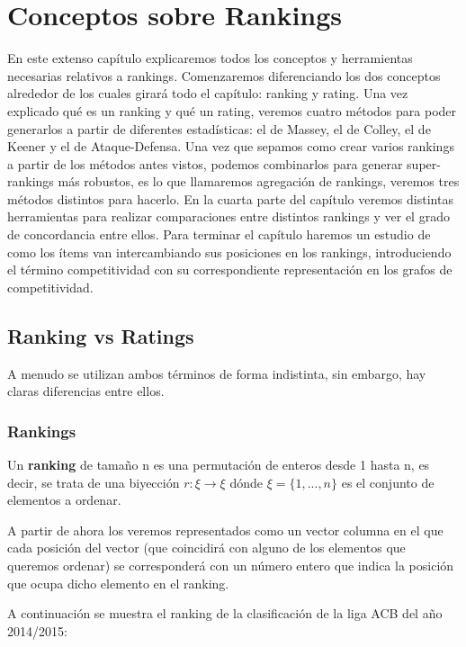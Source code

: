 \chapter{Conceptos sobre Rankings}
En este extenso capítulo explicaremos todos los conceptos y herramientas necesarias relativos a rankings. Comenzaremos diferenciando los dos conceptos alrededor de los cuales girará todo el capítulo: ranking y rating. Una vez explicado qué es un ranking y qué un rating, veremos cuatro métodos para poder generarlos a partir de diferentes estadísticas: el de Massey, el de Colley, el de Keener y el de Ataque-Defensa. Una vez que sepamos como crear varios rankings a partir de los métodos antes vistos, podemos combinarlos para generar super-rankings más robustos, es lo que llamaremos agregación de rankings, veremos tres métodos distintos para hacerlo. En la cuarta parte del capítulo veremos distintas herramientas para realizar comparaciones entre distintos rankings y ver el grado de concordancia entre ellos. Para terminar el capítulo haremos un estudio de como los ítems van intercambiando sus posiciones en los rankings, introduciendo el término competitividad con su correspondiente representación en los grafos de competitividad. 

\section{Ranking vs Ratings}
A menudo se utilizan ambos términos de forma indistinta, sin embargo, hay claras diferencias entre ellos. \cite{cap1}

\subsection{Rankings}
\begin{defi} 
	Un \textbf{ranking} de tamaño n es una permutación de enteros desde 1 hasta n, es decir, se trata de una biyección $r: \xi \rightarrow \xi$ dónde $\xi = \{1,...,n\}$ es el conjunto de elementos a ordenar.
\end{defi}
A partir de ahora los veremos representados como un vector columna en el que cada posición del vector (que coincidirá con alguno de los elementos que queremos ordenar) se corresponderá con un número entero que indica la posición que ocupa dicho elemento en el ranking.\\ 
 
\begin{ejem} \label{ejem1}
A continuación se muestra el ranking de la clasificación de la liga ACB del año 2014/2015:
\end{ejem}
	
